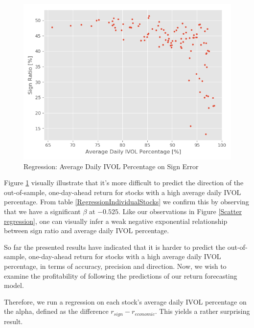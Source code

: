 \begin{figure}[h]
    \centering
    \includegraphics[scale = 0.5]{Plot/IndividualStockRegression1.png}
    \caption{Regression: Average Daily IVOL Percentage on Sign Error}
    \label{IVSignError}
\end{figure}

Figure \ref{IVSignError} visually illustrate that it's more difficult to predict the direction of the out-of-sample, one-day-ahead return for stocks with a high average daily IVOL percentage. From table \ref{RegressionIndividualStocks} we confirm this by observing that we have a significant $\beta$ at $-0.525$. Like our observations in Figure \ref{Scatter regression}, one can visually infer a weak negative exponential relationship between sign ratio and average daily IVOL percentage.

So far the presented results have indicated that it is harder to predict the out-of-sample, one-day-ahead return for stocks with a high average daily IVOL percentage, in terms of accuracy, precision and direction. Now, we wish to examine the profitability of following the predictions of our return forecasting model. 

Therefore, we run a regression on each stock’s average daily IVOL percentage on the alpha, defined as the difference $r_{sign}-r_{economic}$. This yields a rather surprising result.

